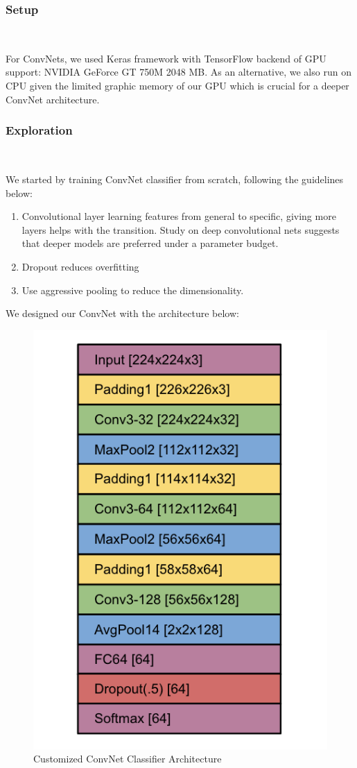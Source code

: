 \documentclass[journal, 10pt]{IEEEtran}
\begin{document}
  \subsubsection{Setup} \

  For ConvNets, we used Keras framework \cite{Keras} with TensorFlow \cite{TensorFlow} backend of GPU support: NVIDIA GeForce GT 750M 2048 MB. As an alternative, we also run on CPU given the limited graphic memory of our GPU which is crucial for a deeper ConvNet architecture.

  \subsubsection{Exploration} \

  We started by training ConvNet classifier from scratch, following the guidelines below:
  \begin{enumerate}
    \item Convolutional layer learning features from general to specific, giving more layers helps with the transition. Study on deep convolutional nets suggests that deeper models are preferred under a parameter budget\cite{Deep2013}.
    \item Dropout reduces overfitting \cite{Dropout} \cite{Alex2014}
    \item Use aggressive pooling to reduce the dimensionality.
  \end{enumerate}
  We designed our ConvNet with the architecture below:
  \begin{figure}[H]
    \centering
    \includegraphics[scale=0.4]{cnn_arch}
    \caption{Customized ConvNet Classifier Architecture}
    \label{cnn_arch}
  \end{figure}
\end{document}
